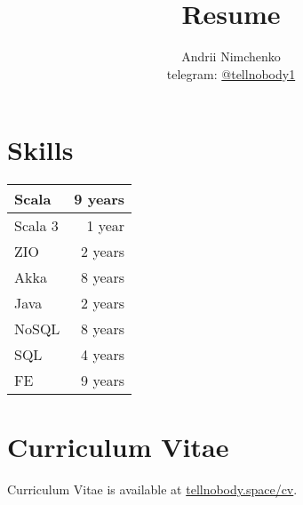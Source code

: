 

\title{Resume}
\author{
  Andrii Nimchenko\\
  telegram: \href{https://t.me/tellnobody1}{@tellnobody1}
}
\date{}
\maketitle

\section*{Skills}
\begin{table}[H]
  \begin{tabular}{lr}
  Scala    &  9 years \\ \hline
  Scala 3  &  1 year  \\ \hline
  ZIO      &  2 years \\ \hline
  Akka     &  8 years \\ \hline
  Java     &  2 years \\ \hline
  NoSQL    &  8 years \\ \hline
  SQL      &  4 years \\ \hline
  FE       &  9 years \\
  \end{tabular}
\end{table}

\section*{Curriculum Vitae}
Curriculum Vitae is available at \href{https://tellnobody.space/cv/}{tellnobody.space/cv}.

